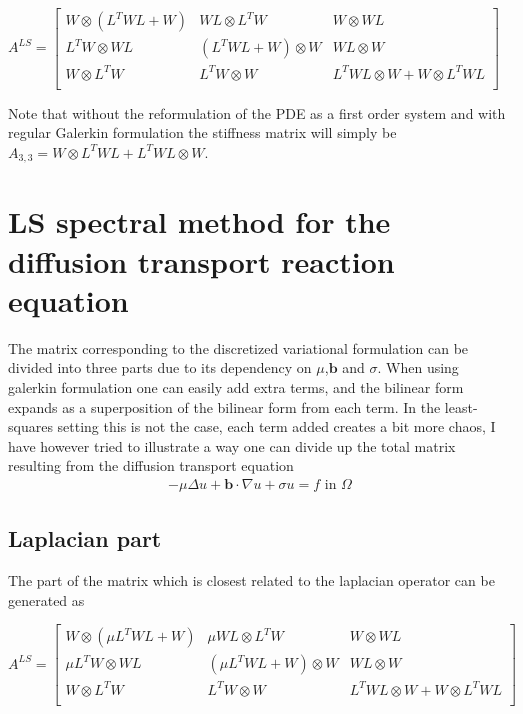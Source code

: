 %
$
A^{LS} = 
\begin{bmatrix}
	W \otimes (L^TWL+W) & WL \otimes L^TW 		 &	W \otimes WL  \\ 	
	L^TW \otimes WL     & (L^TWL+W) \otimes W  &	WL \otimes W  \\ 	
	W \otimes L^TW		  & L^TW \otimes W       &  L^TWL \otimes W +	W\otimes L^TWL  \\ 	
\end{bmatrix}
$

Note that without the reformulation of the PDE as a first order system and with regular Galerkin formulation the stiffness matrix will simply be 
$A_{3,3} = W \otimes L^TWL+ L^TWL \otimes W$.
\section{LS spectral method for the diffusion transport reaction equation}
The matrix corresponding to the discretized variational formulation can be divided into three parts due to its dependency on $\mu$,$\mathbf{b}$ and $\sigma$. When using galerkin formulation one can easily add extra terms, and the bilinear form expands as a superposition of the bilinear form from each term. In the least-squares setting this is not the case, each term added creates a bit more chaos, I have however tried to illustrate a way one can divide up the total matrix resulting from the diffusion transport equation
\begin{align}
	-\mu \Delta u + \mathbf{b} \cdot \nabla u +\sigma u = f \text{ in } \Omega
	\label{eq:ReactionImplementation}
\end{align}
\subsection{Laplacian part}
The part of the matrix which is closest related to the laplacian operator can be generated as 

$
A^{LS} = 
\begin{bmatrix}
	W \otimes (\mu L^TWL+W) & \mu WL \otimes L^TW 		 &	W \otimes WL  \\ 	
	\mu L^TW \otimes WL     & (\mu L^TWL+W) \otimes W  &	WL \otimes W  \\ 	
	W \otimes L^TW		  & L^TW \otimes W       &  L^TWL \otimes W +	W\otimes L^TWL  \\ 	
\end{bmatrix}
$

